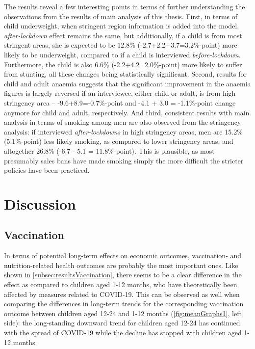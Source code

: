 \documentclass[12pt,a4paper,notitlepage]{article}
\begin{document}
The results reveal a few interesting points in terms of further understanding the observations from the results of main analysis of this thesis. First, in terms of child underweight, when stringent region information is added into the model, \textit{after-lockdown} effect remains the same, but additionally, if a child is from most stringent areas, she is expected to be 12.8\% (-2.7+2.2+3.7=3.2\%-point) more likely to be underweight, compared to if a child is interviewed \textit{before-lockdown}. Furthermore, the child is also 6.6\% (-2.2+4.2=2.0\%-point) more likely to suffer from stunting, all these changes being statistically significant. Second, results for child and adult anaemia suggests that the significant improvement in the anaemia figures is largely reversed if an interviewee, either child or adult, is from high stringency area -- -9.6+8.9=-0.7\%-point and -4.1 + 3.0 = -1.1\%-point change anymore for child and adult, respectively. And third, consistent results with main analysis in terms of smoking among men are also observed from the stringency analysis: if interviewed \textit{after-lockdowns} in high stringency areas, men are 15.2\% (5.1\%-point) less likely smoking, as compared to lower stringency areas, and altogether 26.8\% (-6.7 - 5.1 = 11.8\%-point). This is plausible, as most presumably sales bans have made smoking simply the more difficult the stricter policies have been practiced.



\newpage
\section{Discussion} \label{sec:discussion}

\subsection{Vaccination} \label{subsec:discussionVaccination}

In terms of potential long-term effects on economic outcomes, vaccination- and nutrition-related health outcomes are probably the most important ones. Like shown in \cref{subsec:resultsVaccination}, there seems to be a clear difference in the effect as compared to children aged 1-12 months, who have theoretically been affected by measures related to COVID-19. This can be observed as well when comparing the differences in long-term trends for the corresponding vaccination outcome between children aged 12-24 and 1-12 months (\cref{fig:meanGraphs1}, left side): the long-standing downward trend for children aged 12-24 has continued with the spread of COVID-19 while the decline has stopped with children aged 1-12 months.
\end{document}
